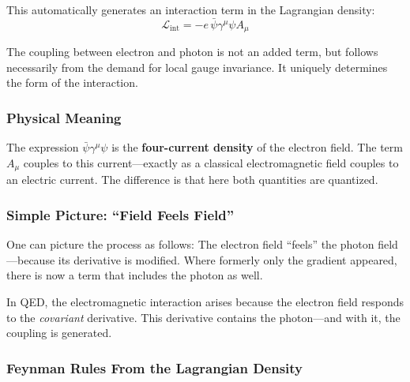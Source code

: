 This automatically generates an interaction term in the Lagrangian density:
\[
\mathcal{L}_{\text{int}} = -e \, \bar{\psi} \gamma^\mu \psi A_\mu
\]

\vspace{0.5em}
\begin{tcolorbox}[mathebox, title=Coupling From Principle]
	\label{box:Kopplung aus Prinzip}
	The coupling between electron and photon is not an added term, but follows necessarily from the demand for local gauge invariance. It uniquely determines the form of the interaction.
\end{tcolorbox}

\subsubsection*{Physical Meaning}
The expression $\bar{\psi} \gamma^\mu \psi$ is the \textbf{four-current density} of the electron field. The term $A_\mu$ couples to this current—exactly as a classical electromagnetic field couples to an electric current. The difference is that here both quantities are quantized.

\subsubsection*{Simple Picture: “Field Feels Field”}
One can picture the process as follows: The electron field “feels” the photon field—because its derivative is modified. Where formerly only the gradient appeared, there is now a term that includes the photon as well.

\vspace{1em}
\begin{tcolorbox}[didaktikbox, title=The Force Arises From the Derivative]
	\label{box:Die Kraft entsteht aus dem Ableiter}
	In QED, the electromagnetic interaction arises because the electron field responds to the \emph{covariant} derivative. This derivative contains the photon—and with it, the coupling is generated.
\end{tcolorbox}

\subsubsection{Feynman Rules From the Lagrangian Density}

